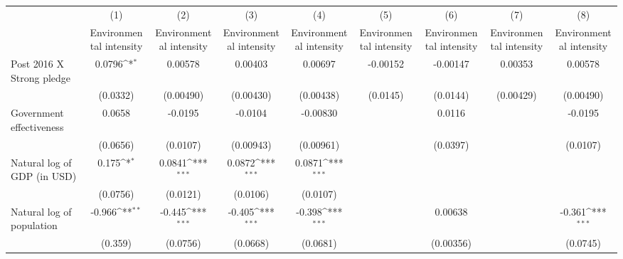 {
\def\sym#1{\ifmmode^{#1}\else\(^{#1}\)\fi}
\begin{tabular}{l*{8}{c}}
\hline\hline
                    &\multicolumn{1}{c}{(1)}&\multicolumn{1}{c}{(2)}&\multicolumn{1}{c}{(3)}&\multicolumn{1}{c}{(4)}&\multicolumn{1}{c}{(5)}&\multicolumn{1}{c}{(6)}&\multicolumn{1}{c}{(7)}&\multicolumn{1}{c}{(8)}\\
                    &\multicolumn{1}{c}{Environmental intensity}&\multicolumn{1}{c}{Environmental intensity}&\multicolumn{1}{c}{Environmental intensity}&\multicolumn{1}{c}{Environmental intensity}&\multicolumn{1}{c}{Environmental intensity}&\multicolumn{1}{c}{Environmental intensity}&\multicolumn{1}{c}{Environmental intensity}&\multicolumn{1}{c}{Environmental intensity}\\
\hline
Post 2016 X Strong pledge&      0.0796\sym{*}  &     0.00578         &     0.00403         &     0.00697         &    -0.00152         &    -0.00147         &     0.00353         &     0.00578         \\
                    &    (0.0332)         &   (0.00490)         &   (0.00430)         &   (0.00438)         &    (0.0145)         &    (0.0144)         &   (0.00429)         &   (0.00490)         \\
[1em]
Government effectiveness&      0.0658         &     -0.0195         &     -0.0104         &    -0.00830         &                     &      0.0116         &                     &     -0.0195         \\
                    &    (0.0656)         &    (0.0107)         &   (0.00943)         &   (0.00961)         &                     &    (0.0397)         &                     &    (0.0107)         \\
[1em]
Natural log of GDP (in USD)&       0.175\sym{*}  &      0.0841\sym{***}&      0.0872\sym{***}&      0.0871\sym{***}&                     &                     &                     &                     \\
                    &    (0.0756)         &    (0.0121)         &    (0.0106)         &    (0.0107)         &                     &                     &                     &                     \\
[1em]
Natural log of population&      -0.966\sym{**} &      -0.445\sym{***}&      -0.405\sym{***}&      -0.398\sym{***}&                     &     0.00638         &                     &      -0.361\sym{***}\\
                    &     (0.359)         &    (0.0756)         &    (0.0668)         &    (0.0681)         &                     &   (0.00356)         &                     &    (0.0745)         \\

\end{tabular}}
